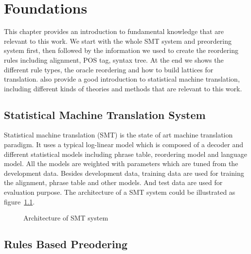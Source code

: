 
\chapter{Foundations}
\label{ch:Foundations}

This chapter provides an introduction to fundamental knowledge that are relevant to this work. We start with the whole SMT system and preordering system first, then followed by the information we used to create the reordering rules including alignment, POS tag, syntax tree. At the end we shows the different rule types, the oracle reordering and how to build lattices for translation. \cite{book} also provide a good introduction to statistical machine translation, including different kinds of theories and methods that are relevant to this work.

\section{Statistical Machine Translation System}
\label{ch:Foundations:sec:SMTSystem}


Statistical machine translation (SMT) is the state of art machine translation paradigm. It uses a typical log-linear model which is composed of a decoder and different statistical models including phrase table, reordering model and language model. All the models are weighted with parameters which are tuned from the development data. Besides development data, training data are used for training the alignment, phrase table and other models. And test data are used for evaluation purpose. The architecture of a SMT system could be illustrated as figure~\ref{smt}.

\begin{figure}
\centering

\caption{Architecture of SMT system}
\label{smt}
\end{figure}

\section{Rules Based Preodering}
\label{ch:Foundations:sec:PreReorderingSystem}

